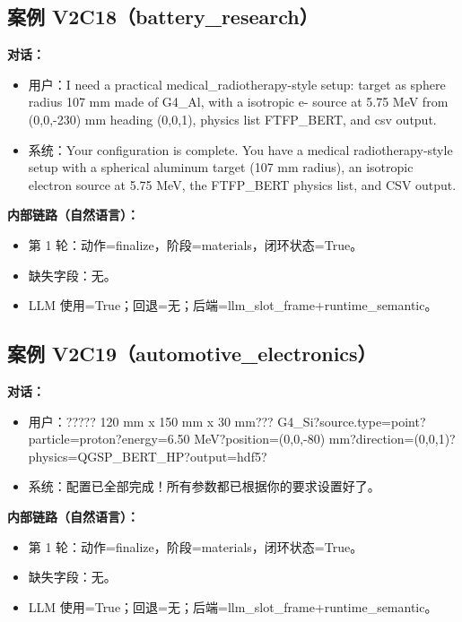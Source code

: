 \documentclass[11pt]{ctexart}
\begin{document}
\subsection{案例 V2C18（battery\_research）}
\textbf{对话：}
\begin{itemize}
\item 用户：I need a practical medical\_radiotherapy-style setup: target as sphere radius 107 mm made of G4\_Al, with a isotropic e- source at 5.75 MeV from (0,0,-230) mm heading (0,0,1), physics list FTFP\_BERT, and csv output.
\item 系统：Your configuration is complete. You have a medical radiotherapy-style setup with a spherical aluminum target (107 mm radius), an isotropic electron source at 5.75 MeV, the FTFP\_BERT physics list, and CSV output.
\end{itemize}
\textbf{内部链路（自然语言）：}
\begin{itemize}
\item 第 1 轮：动作=finalize，阶段=materials，闭环状态=True。
\item 缺失字段：无。
\item LLM 使用=True；回退=无；后端=llm\_slot\_frame+runtime\_semantic。
\end{itemize}
\subsection{案例 V2C19（automotive\_electronics）}
\textbf{对话：}
\begin{itemize}
\item 用户：????? 120 mm x 150 mm x 30 mm??? G4\_Si?source.type=point?particle=proton?energy=6.50 MeV?position=(0,0,-80) mm?direction=(0,0,1)?physics=QGSP\_BERT\_HP?output=hdf5?
\item 系统：配置已全部完成！所有参数都已根据你的要求设置好了。
\end{itemize}
\textbf{内部链路（自然语言）：}
\begin{itemize}
\item 第 1 轮：动作=finalize，阶段=materials，闭环状态=True。
\item 缺失字段：无。
\item LLM 使用=True；回退=无；后端=llm\_slot\_frame+runtime\_semantic。
\end{itemize}
\end{document}
